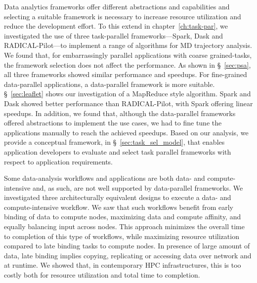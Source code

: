 Data analytics frameworks offer different abstractions and capabilities and
selecting a suitable framework is necessary to increase resource
utilization and reduce the development effort.
To this extend in chapter~\ref{ch:task-par}, we investigated the
use of three task-parallel frameworks---Spark, Dask and RADICAL-Pilot---to
implement a range of algorithms for MD trajectory analysis.
We found that, for embarrassingly parallel applications with coarse 
grained-tasks, the framework selection does not affect the performance.
As shown in \S~\ref{sec:psa}, all three frameworks showed similar
performance and speedups. For fine-grained data-parallel applications, a 
data-parallel framework is more suitable. \S~\ref{sec:leaflet} shows our
investigation of a MapReduce style algorithm. Spark and Dask showed better
performance than RADICAL-Pilot, with Spark offering linear speedups.
In addition, we found that, although the data-parallel frameworks offered
abstractions to implement the use cases, we had to fine tune the applications
manually to reach the achieved speedups. 
Based on our analysis, we provide a conceptual framework, in 
\S~\ref{sec:task_sel_model}, that enables application developers to 
evaluate and select task parallel frameworks with respect to application 
requirements. 

Some data-analysis workflows and applications are both data- and
compute-intensive and, as such, are not well supported by data-parallel
frameworks. We investigated three architecturally equivalent designs to execute
a data- and compute-intensive workflow. We saw that such workflows benefit from
early binding of data to compute nodes, maximizing data and compute affinity,
and equally balancing input across nodes. This approach minimizes the overall
time to completion of this type of workflows, while maximizing resource
utilization compared to late binding tasks to compute nodes. In presence of
large amount of data, late binding implies copying, replicating or accessing
data over network and at runtime. We showed that, in contemporary HPC
infrastructures, this is too costly both for resource utilization and total time
to completion.


